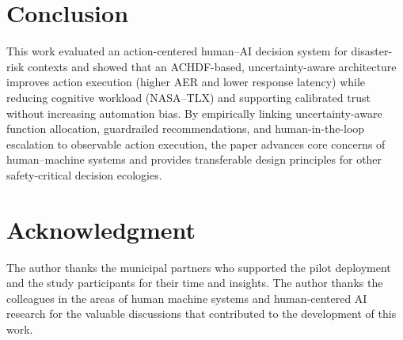 \documentclass[journal]{IEEEtran}
\theoremstyle{plain}
\theoremstyle{definition}
\begin{document}
\section{Conclusion}
This work evaluated an action-centered human--AI decision system for disaster-risk contexts and showed that an ACHDF-based, uncertainty-aware architecture improves action execution (higher AER and lower response latency) while reducing cognitive workload (NASA--TLX) and supporting calibrated trust without increasing automation bias. By empirically linking uncertainty-aware function allocation, guardrailed recommendations, and human-in-the-loop escalation to observable action execution, the paper advances core concerns of human--machine systems and provides transferable design principles for other safety-critical decision ecologies.

\section*{Acknowledgment}
The author thanks the municipal partners who supported the pilot deployment and the study participants for their time and insights. The author thanks the colleagues in the areas of human machine systems and human-centered AI research for the valuable discussions that contributed to the development of this work.


% 
\end{document}
